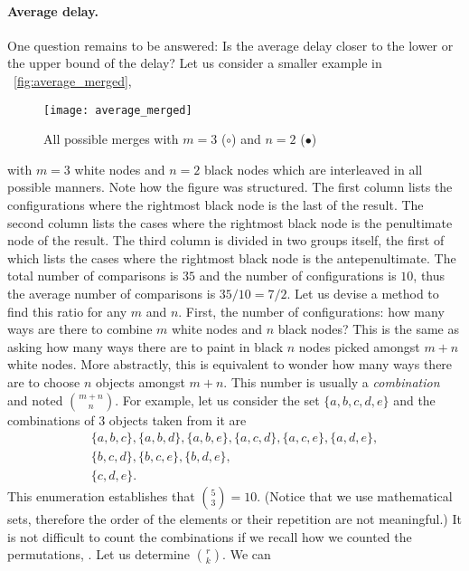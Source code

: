 \medskip

\paragraph{Average delay.}

One question remains to be answered: Is the average delay closer to
the lower or the upper bound of the delay? Let us consider a smaller
example in \fig~\vref{fig:average_merged}, 
\begin{figure}
\centering
\texttt{[image: average\_merged]}
\caption{All possible merges with \(m=3\) (\(\circ\)) and \(n=2\)
  (\(\bullet\))
\label{fig:average_merged}}
\end{figure}
with \(m=3\) white nodes and \(n=2\) black nodes which are interleaved
in all possible manners.  Note how the figure was structured. The
first column lists the configurations where the rightmost black node
is the last of the result. The second column lists the cases where the
rightmost black node is the penultimate node of the result. The third
column is divided in two groups itself, the first of which lists the
cases where the rightmost black node is the antepenultimate. The total
number of comparisons is \(35\) and the number of configurations is
\(10\), thus the average number of comparisons is \(35/10 =
7/2\).\label{seven_two} Let us devise a method to find this ratio for
any \(m\) and \(n\). First, the number of configurations: how many
ways are there to combine \(m\) white nodes and \(n\) black nodes?
This is the same as asking how many ways there are to paint in black
\(n\) nodes picked amongst \(m+n\) white nodes. More abstractly, this
is equivalent to wonder how many ways there are to choose \(n\)
objects amongst \(m+n\). This number is usually a \emph{combination}
and noted \(\binom{m+n}{n}\). For example, let us consider the set
\(\{a,b,c,d,e\}\) and the combinations of \(3\) objects taken from it
are
\begin{gather*}
\{a,b,c\},\{a,b,d\},\{a,b,e\},\{a,c,d\},\{a,c,e\},\{a,d,e\},\\
\{b,c,d\},\{b,c,e\},\{b,d,e\},\\
\{c,d,e\}.
\end{gather*}
This enumeration establishes that \(\binom{5}{3} = 10\). (Notice that
we use mathematical sets, therefore the order of the elements or their
repetition are not meaningful.) It is not difficult to count the
combinations if we recall how we counted the permutations,
. Let us determine \(\binom{r}{k}\). We can
